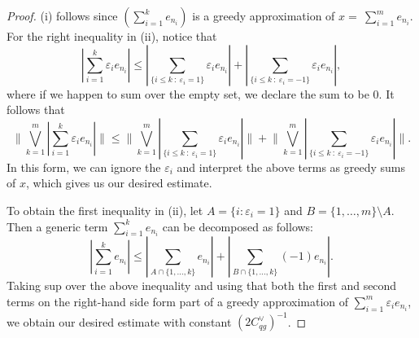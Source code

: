 \documentclass[12pt,leqno]{amsart}
\numberwithin{equation}{section}
\theoremstyle{definition}
\begin{document}
\begin{proof}
(i) follows since $(\sum_{i=1}^ke_{n_{i}})$ is a greedy approximation of $x=~\sum_{i=1}^m e_{n_i}$.
For the right inequality in (ii), notice that
$$\left|\sum_{i=1}^k\varepsilon_i e_{n_i}\right|\leq \left|\sum_{\{i\leq k\ : \  \varepsilon_i=1\}} \varepsilon_{i}e_{n_i}\right|+\left|\sum_{\{i\leq k\ :\  \varepsilon_i=-1\}}\varepsilon_ie_{n_i}\right|,$$
where if we happen to sum over the empty set, we declare the sum to be $0$. It follows that
$$\bigg\|\bigvee_{k=1}^m\left|\sum_{i=1}^k\varepsilon_i e_{n_i}\right|\bigg\|\leq \bigg\|\bigvee_{k=1}^m\left|\sum_{\{i\leq k\ : \  \varepsilon_i=1\}} \varepsilon_{i}e_{n_i}\right|\bigg\|+\bigg\|\bigvee_{k=1}^m\left|\sum_{\{i\leq k\ :\  \varepsilon_i=-1\}}\varepsilon_ie_{n_i}\right|\bigg\|.$$
In this form,   we can ignore the $\varepsilon_i$ and interpret the above terms as greedy sums of $x$, which gives us our desired estimate.
\medskip





To obtain the first inequality in (ii), let $A=\{i: \varepsilon_i=1\}$ and $B=\{1,\dots,m\}\setminus A$. Then a generic term $\sum_{i=1}^ke_{n_i}$ can be decomposed as follows:
$$\left|\sum_{i=1}^ke_{n_i}\right|\leq \left|\sum_{A\cap\{1,\dots,k\}}e_{n_i}\right|+\left|\sum_{B\cap\{1,\dots,k\}}(-1)e_{n_i}\right|.$$
Taking sup over the above inequality and using that both the first and second terms on the right-hand side form part of a greedy approximation of $\sum_{i=1}^m\varepsilon_ie_{n_i}$, we obtain our desired estimate with constant  $(2C_{qg}^\vee )^{-1}$.




\end{proof}
\end{document}
